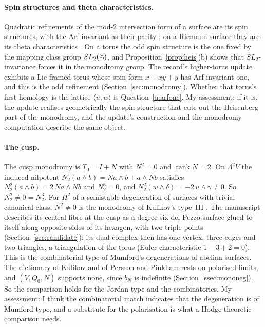 \paragraph{Spin structures and theta characteristics.} Quadratic refinements of the mod-$2$ intersection form of a surface are its spin structures, with the Arf invariant as their parity \cite{Johnson}; on a Riemann surface they are its theta characteristics \cite{AtiyahSpin}. On a torus the odd spin structure is the one fixed by the mapping class group $SL_2(\mathbb{Z})$, and Proposition~\ref{prop:heis}(b) shows that $SL_2$-invariance forces it in the monodromy group. The record's higher-torus update exhibits a Lie-framed torus whose spin form $x+xy+y$ has Arf invariant one, and this is the odd refinement (Section~\ref{sec:monodromy}). Whether that torus's first homology is the lattice $\langle\bar u,\bar w\rangle$ is Question~\ref{q:arfone}. My assessment: if it is, the update realises geometrically the spin structure that cuts out the Heisenberg part of the monodromy, and the update's construction and the monodromy computation describe the same object.

\paragraph{The cusp.} The cusp monodromy is $T_0=I+N$ with $N^2=0$ and $\operatorname{rank}N=2$. On $\Lambda^2V$ the induced nilpotent $N_2(a\wedge b)=Na\wedge b+a\wedge Nb$ satisfies $N_2^2(a\wedge b)=2\,Na\wedge Nb$ and $N_2^3=0$, and $N_2^2(w\wedge\delta)=-2\,u\wedge\gamma\neq0$. So $N_2^2\neq0=N_2^3$. For $H^2$ of a semistable degeneration of surfaces with trivial canonical class, $N^2\neq0$ is the monodromy of Kulikov's type~III \cite{Kulikov,PerssonPinkham}. The manuscript describes its central fibre at the cusp as a degree-six del Pezzo surface glued to itself along opposite sides of its hexagon, with two triple points (Section~\ref{sec:candidate}); its dual complex then has one vertex, three edges and two triangles, a triangulation of the torus (Euler characteristic $1-3+2=0$). This is the combinatorial type of Mumford's degenerations of abelian surfaces. The dictionary of Kulikov and of Persson and Pinkham rests on polarised limits, and $(V,Q_0,N)$ supports none, since $b_N$ is indefinite (Section~\ref{ssec:mononeg}). So the comparison holds for the Jordan type and the combinatorics. My assessment: I think the combinatorial match indicates that the degeneration is of Mumford type, and a substitute for the polarisation is what a Hodge-theoretic comparison needs.

